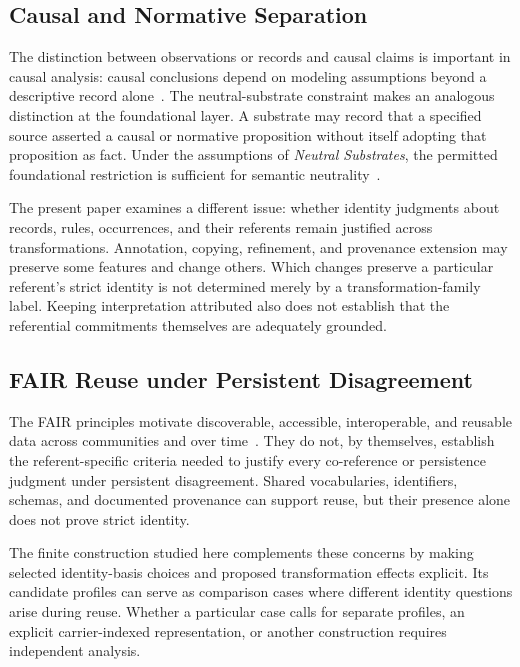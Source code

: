 \subsection{Causal and Normative Separation}
\label{subsec:related_causal_normative}

The distinction between observations or records and causal claims is
important in causal analysis: causal conclusions depend on modeling
assumptions beyond a descriptive record alone~\citep{pearl2009}.
The neutral-substrate constraint makes an analogous distinction at
the foundational layer.
A substrate may record that a specified
source asserted a causal or normative proposition without itself
adopting that proposition as fact.
Under the assumptions of
\emph{Neutral Substrates}, the permitted foundational restriction is
sufficient for semantic neutrality~\citep{case2026neutral}.

The present paper examines a different issue: whether identity
judgments about records, rules, occurrences, and their referents
remain justified across transformations.
Annotation, copying,
refinement, and provenance extension may preserve some features and
change others.
Which changes preserve a particular referent's strict
identity is not determined merely by a transformation-family label.
Keeping interpretation attributed also does not establish that the
referential commitments themselves are adequately grounded.

\subsection{FAIR Reuse under Persistent Disagreement}
\label{subsec:related_fair}

The FAIR principles motivate discoverable, accessible, interoperable,
and reusable data across communities and over time~\citep{wilkinson2016}.
They do not, by themselves, establish the referent-specific criteria
needed to justify every co-reference or persistence judgment under
persistent disagreement.
Shared vocabularies, identifiers, schemas,
and documented provenance can support reuse, but their presence alone
does not prove strict identity.

The finite construction studied here complements these concerns by
making selected identity-basis choices and proposed transformation
effects explicit.
Its candidate profiles can serve as comparison
cases where different identity questions arise during reuse.
Whether a particular case calls for separate profiles, an explicit
carrier-indexed representation, or another construction
requires independent analysis.
